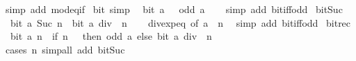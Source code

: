\begin{isabellebody}
%
\isatagproof
{}\isamarkupfalse%
\ {\isacharparenleft}{\kern0pt}simp\ add{\isacharcolon}{\kern0pt}\ mod{}{\isacharunderscore}{\kern0pt}eq{\isacharunderscore}{\kern0pt}if{\isacharparenright}{\kern0pt}%
\endisatagproof
{\isafoldproof}%
%
\isadelimproof
\isanewline
%
\endisadelimproof
\isanewline
{}\isamarkupfalse%
\ bit{\isacharunderscore}{\kern0pt}{}\ {\isacharbrackleft}{\kern0pt}simp{\isacharbrackright}{\kern0pt}{\isacharcolon}{\kern0pt}\isanewline
\ \ {\isacartoucheopen}bit\ a\ {}\ {\isasymlongleftrightarrow}\ odd\ a{\isacartoucheclose}\isanewline
%
\isadelimproof
\ \ %
\endisadelimproof
%
\isatagproof
{}\isamarkupfalse%
\ {\isacharparenleft}{\kern0pt}simp\ add{\isacharcolon}{\kern0pt}\ bit{\isacharunderscore}{\kern0pt}iff{\isacharunderscore}{\kern0pt}odd{\isacharparenright}{\kern0pt}%
\endisatagproof
{\isafoldproof}%
%
\isadelimproof
\isanewline
%
\endisadelimproof
\isanewline
{}\isamarkupfalse%
\ bit{\isacharunderscore}{\kern0pt}Suc{\isacharcolon}{\kern0pt}\isanewline
\ \ {\isacartoucheopen}bit\ a\ {\isacharparenleft}{\kern0pt}Suc\ n{\isacharparenright}{\kern0pt}\ {\isasymlongleftrightarrow}\ bit\ {\isacharparenleft}{\kern0pt}a\ div\ {}{\isacharparenright}{\kern0pt}\ n{\isacartoucheclose}\isanewline
%
\isadelimproof
\ \ %
\endisadelimproof
%
\isatagproof
{}\isamarkupfalse%
\ div{\isacharunderscore}{\kern0pt}exp{\isacharunderscore}{\kern0pt}eq\ {\isacharbrackleft}{\kern0pt}of\ a\ {}\ n{\isacharbrackright}{\kern0pt}\ \isamarkupfalse%
\ {\isacharparenleft}{\kern0pt}simp\ add{\isacharcolon}{\kern0pt}\ bit{\isacharunderscore}{\kern0pt}iff{\isacharunderscore}{\kern0pt}odd{\isacharparenright}{\kern0pt}%
\endisatagproof
{\isafoldproof}%
%
\isadelimproof
\isanewline
%
\endisadelimproof
\isanewline
{}\isamarkupfalse%
\ bit{\isacharunderscore}{\kern0pt}rec{\isacharcolon}{\kern0pt}\isanewline
\ \ {\isacartoucheopen}bit\ a\ n\ {\isasymlongleftrightarrow}\ {\isacharparenleft}{\kern0pt}if\ n\ {\isacharequal}{\kern0pt}\ {}\ then\ odd\ a\ else\ bit\ {\isacharparenleft}{\kern0pt}a\ div\ {}{\isacharparenright}{\kern0pt}\ {\isacharparenleft}{\kern0pt}n\ {\isacharminus}{\kern0pt}\ {}{\isacharparenright}{\kern0pt}{\isacharparenright}{\kern0pt}{\isacartoucheclose}\isanewline
%
\isadelimproof
\ \ %
\endisadelimproof
%
\isatagproof
{}\isamarkupfalse%
\ {\isacharparenleft}{\kern0pt}cases\ n{\isacharparenright}{\kern0pt}\ {\isacharparenleft}{\kern0pt}simp{\isacharunderscore}{\kern0pt}all\ add{\isacharcolon}{\kern0pt}\ bit{\isacharunderscore}{\kern0pt}Suc{\isacharparenright}{\kern0pt}%

\end{isabellebody}
